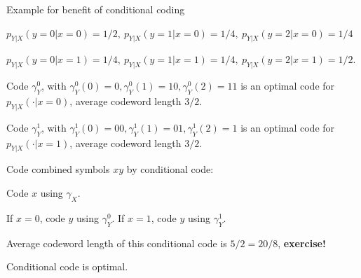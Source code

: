 \begin{frame}{Example for benefit of conditional coding}
\bit
\item $p_{Y|X}(y=0|x=0)=1/2,\:p_{Y|X}(y=1|x=0)=1/4,\:p_{Y|X}(y=2|x=0)=1/4$ 
\item $p_{Y|X}(y=0|x=1)=1/4,\:p_{Y|X}(y=1|x=1)=1/4,\:p_{Y|X}(y=2|x=1)=1/2$.
\eit
\smallskip
{}
\bit
\item Code $\gamma^{0}_{Y}$, with $\gamma^{0}_Y(0)=0, \gamma^{0}_Y(1)=10, \gamma^{0}_Y(2)=11$ is an optimal code for $p_{Y|X}(\cdot|x=0)$,  
average codeword length $3/2$.
\item Code $\gamma^{1}_Y$, with $\gamma^{1}_Y(0)=00, \gamma^{1}_Y(1)=01, \gamma^{1}_Y(2)=1$ is an optimal code for $p_{Y|X}(\cdot|x=1)$,  
average codeword length $3/2$.
\item Code combined symbols $xy$ by conditional code: 
\bit
\item Code $x$ using $\gamma_X$.
\item If $x=0$, code $y$ using $\gamma_Y^0$. If $x=1$, code $y$ using $\gamma_Y^1$. 
\eit
\item Average codeword length of this conditional code is $5/2=20/8$, \textbf{exercise! } 
\item Conditional code is optimal. 
\eit
\smallskip
{}
\end{frame}

